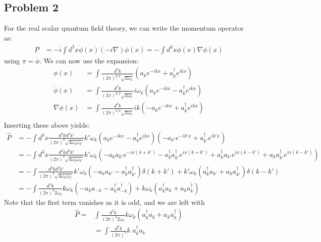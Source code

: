 \documentclass{../mathnotes}
\begin{document}
\subsection*{Problem 2}

For the real scalar quantum field theory, we can write the momentum operator as:
\begin{align*}
    \hat P&=-i\int d^3x \dot\phi(x) \left( -i\nabla \right)\phi(x)=-\int d^3x \dot\phi(x)\nabla\phi(x)
\end{align*}
using $\pi=\dot\phi$. We can now use the expansion:
\begin{align*}
    \phi(x)&=\int \frac{d^3k}{(2\pi)^{3/2}\sqrt{2\omega_k}}\left( a_ke^{-ikx}+a_k^\dagger e^{ikx} \right)\\
    \dot\phi(x)&=\int \frac{d^3k}{(2\pi)^{3/2}\sqrt{2\omega_k}}i\omega_k\left( a_ke^{-ikx}-a_k^\dagger e^{ikx} \right)\\
    \nabla\phi(x)&=\int \frac{d^3k}{(2\pi)^{3/2}\sqrt{2\omega_k}}ik\left( -a_ke^{-ikx}+a_k^\dagger e^{ikx} \right)\\
\end{align*}
Inserting these above yields:
\begin{align*}
    \hat P&=-\int d^3x\frac{d^3k d^3k'}{(2\pi)^3 \sqrt{4\omega_k\omega_{k'}}}k'\omega_{k}\left( a_ke^{-ikx}-a_k^\dagger e^{ikx} \right)\left( -a_{k'}e^{-ik'x}+a_{k'}^\dagger e^{ik'x} \right)\\
    &=-\int d^3x\frac{d^3k d^3k'}{(2\pi)^3 \sqrt{4\omega_k\omega_{k'}}}k'\omega_{k}\left( -a_ka_{k'}e^{-ix(k+k')}-a_k^\dagger a_{k'}^\dagger e^{ix(k+k')}+a_k^\dagger a_{k'}e^{ix(k-k')}+a_ka_{k'}^\dagger e^{ix(k-k')} \right)\\
    &=-\int\frac{d^3k d^3k'}{(2\pi)^3 \sqrt{4\omega_k\omega_{k'}}}k'\omega_{k}\left( -a_ka_{k'}-a_k^\dagger a_{k'}^\dagger\right)\delta(k+k')+k'\omega_k\left(a_k^\dagger a_{k'}+a_ka_{k'}^\dagger\right)\delta(k-k')\\
    &=-\int\frac{d^3k}{(2\pi)^3 2\omega_k}k\omega_k\left( -a_ka_{-k}-a_k^\dagger a_{-k}^\dagger \right)+k\omega_k\left(a_k^\dagger a_k+a_ka_k^\dagger\right)
\end{align*}
Note that the first term vanishes as it is odd, and we are left with
\begin{align*}
    \hat P=&\int \frac{d^3k}{(2\pi)^3 2\omega_k}k\omega_k \left( a_k^\dagger a_k+a_ka_k^\dagger \right)\\
    &=\int \frac{d^3k}{(2\pi)^3} k\; a_k^\dagger a_k
\end{align*}
\end{document}
